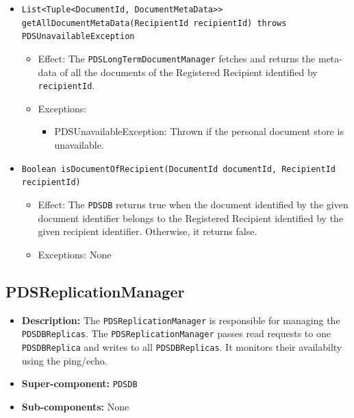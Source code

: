 \documentclass[a4paper,10pt]{article}
\begin{document}
\begin{itemize}
\begin{itemize}
         \item \texttt{List<Tuple<DocumentId, DocumentMetaData>> getAllDocumentMetaData(RecipientId recipientId) throws PDSUnavailableException}
        \begin{itemize}
            \item Effect: The \texttt{PDSLongTermDocumentManager} fetches and returns the meta-data of all the documents of the Registered Recipient identified by \texttt{recipientId}.
            \item Exceptions:
            \begin{itemize}
                \item PDSUnavailableException: Thrown if the personal document store is unavailable.
            \end{itemize}
		\end{itemize}
        
		 \item \texttt{Boolean isDocumentOfRecipient(DocumentId documentId, RecipientId recipientId)}
        \begin{itemize}
            \item Effect: The \texttt{PDSDB} returns true when the document identified by the given document identifier belongs to the Registered Recipient identified by the given recipient identifier. Otherwise, it returns false.
            \item Exceptions: None
		\end{itemize}        
    \end{itemize}
\end{itemize}



\subsection{PDSReplicationManager}
\begin{itemize}
    \item \textbf{Description:} The \texttt{PDSReplicationManager} is responsible for managing the \texttt{PDSDBReplicas}. The \texttt{PDSReplicationManager} passes read requests to one \texttt{PDSDBReplica} and  writes to all \texttt{PDSDBReplicas}. It monitors their availabilty using the ping/echo.
    \item \textbf{Super-component:} \texttt{PDSDB}
    \item \textbf{Sub-components:} None
\end{itemize}
\end{document}
